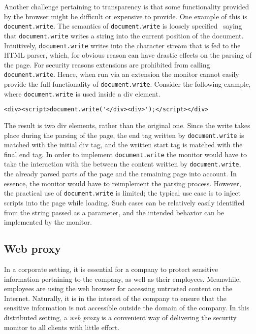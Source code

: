 \documentclass{llncs}
\newcommand{\todo}[1]{\colorbox{red}{\textcolor{white}{\sffamily\bfseries\scriptsize TODO}} \textcolor{red}{#1} \textcolor{red}{$\blacktriangleleft$}}
\begin{document}
Another challenge pertaining to transparency is that some
functionality provided by the browser might be difficult or expensive to
provide.  One example of this is \lstinline{document.write}. The semantics of
\lstinline{document.write} is loosely specified~\cite{DOM:LVL2} saying that
\lstinline{document.write} writes a string into the current position of the
document.  Intuitively, \lstinline{document.write} writes into the character
stream that is fed to the HTML parser, which, for obvious reason can have
drastic effects on the parsing of the page. For security reasons extensions are
prohibited from calling \lstinline{document.write}. Hence, when run via an
extension the monitor cannot easily provide the full functionality of
\lstinline{document.write}.  Consider the following example, where
\lstinline{document.write} is used inside a div element.

\begin{lstlisting}[language=langsmall]
<div><script>document.write('</div><div>');</script></div>
\end{lstlisting}

The result is two div elements, rather than the original one. Since the write
takes place during the parsing of the page, the end tag written by
\lstinline{document.write} is matched with the initial div tag, and the written
start tag is matched with the final end tag. In order to implement
\lstinline{document.write} the monitor would have to take the interaction with the
between the content written by \lstinline{document.write}, the already parsed parts
of the page and the remaining page into account. In essence, the monitor would
have to reimplement the parsing process.  However, the practical use of
\lstinline{document.write} is limited; the typical use case is to inject scripts
into the page while loading. Such cases can be relatively easily identified
from the string passed as a parameter, and the intended behavior can be
implemented by the monitor.




\subsection{Web proxy}
\label{sec:arch-web}
In a corporate setting, it is essential for a company to protect 
sensitive information pertaining to the company, as well as their employees. 
Meanwhile, employees are using the web browser for accessing untrusted content on 
the Internet. Naturally, it is in the interest of the company to ensure that 
the sensitive information is not accessible outside the domain of the company.
In this distributed setting, a \emph{web proxy} is a convenient way of delivering 
the security monitor to all clients with little effort. 
\end{document}
